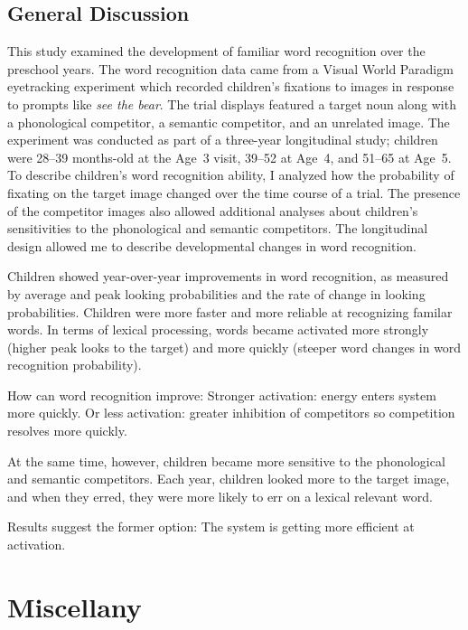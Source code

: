\documentclass [11pt, proquest] {uwthesis}[2015/03/03]
\begin{document}
\chapter{General Discussion}\label{general-discussion}

This study examined the development of familiar word recognition over
the preschool years. The word recognition data came from a Visual World
Paradigm eyetracking experiment which recorded children's fixations to
images in response to prompts like \emph{see the bear}. The trial
displays featured a target noun along with a phonological competitor, a
semantic competitor, and an unrelated image. The experiment was
conducted as part of a three-year longitudinal study; children were
28--39 months-old at the Age~3 visit, 39--52 at Age~4, and 51--65 at
Age~5. To describe children's word recognition ability, I analyzed how
the probability of fixating on the target image changed over the time
course of a trial. The presence of the competitor images also allowed
additional analyses about children's sensitivities to the phonological
and semantic competitors. The longitudinal design allowed me to describe
developmental changes in word recognition.

Children showed year-over-year improvements in word recognition, as
measured by average and peak looking probabilities and the rate of
change in looking probabilities. Children were more faster and more
reliable at recognizing familar words. In terms of lexical processing,
words became activated more strongly (higher peak looks to the target)
and more quickly (steeper word changes in word recognition probability).

How can word recognition improve: Stronger activation: energy enters
system more quickly. Or less activation: greater inhibition of
competitors so competition resolves more quickly.

At the same time, however, children became more sensitive to the
phonological and semantic competitors. Each year, children looked more
to the target image, and when they erred, they were more likely to err
on a lexical relevant word.

Results suggest the former option: The system is getting more efficient
at activation.

\part*{Miscellany}\label{part-misc}
\end{document}
